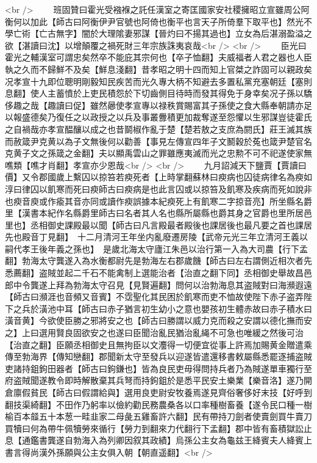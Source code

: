 <br />
　　班固贊曰霍光受襁褓之託任漢室之寄匡國家安社稷擁昭立宣雖周公阿衡何以加此【師古曰阿衡伊尹官號也阿倚也衡平也言天子所倚羣下取平也】然光不學亡術【亡古無字】闇於大理隂妻邪謀【晉灼曰不揚其過也】立女為后湛溺盈溢之欲【湛讀曰沈】以增顛覆之禍死財三年宗族誅夷哀哉<br />
<br />
　　臣光曰霍光之輔漢室可謂忠矣然卒不能庇其宗何也【卒子恤翻】夫威福者人君之器也人臣執之久而不歸鮮不及矣【鮮息淺翻】昔孝昭之明十四而知上官桀之詐固可以親政矣况孝宣十九即位聰明剛毅知民疾苦而光久專大柄不知避去多置私黨充塞朝廷【塞則息翻】使人主蓄憤於上吏民積怨於下切齒側目待時而發其得免于身幸矣况子孫以驕侈趣之哉【趣讀曰促】雖然曏使孝宣專以禄秩賞賜富其子孫使之食大縣奉朝請亦足以報盛德矣乃復任之以政授之以兵及事叢釁積更加裁奪遂至怨懼以生邪謀豈徒霍氏之自禍哉亦孝宣醖釀以成之也昔鬬椒作亂于楚【楚若敖之支庶為閼氏】莊王滅其族而赦箴尹克黄以為子文無後何以勸善【事見左傳宣四年子文鬭穀於菟也箴尹楚官名克黄子文之孫箴之金翻】夫以顯禹雲山之罪雖應夷滅而光之忠勲不可不祀遂使家無噍類【噍才肖翻】孝宣亦少恩哉<br />
<br />
　　九月詔減天下鹽賈【賈讀曰價】又令郡國歲上繫囚以掠笞若瘐死者【上時掌翻蘇林曰瘐病也囚徒病律名為瘐如淳曰律囚以飢寒而死曰瘐師古曰瘐病是也此言囚或以掠笞及飢寒及疾病而死如說非也瘐音庾或作瘉其音亦同或讀作瘐誤據本紀瘐死上有飢寒二字掠音亮】所坐縣名爵里【漢書本紀作名縣爵里師古曰名者其人名也縣所屬縣也爵其身之官爵也里所居邑里也】丞相御史課殿最以聞【師古曰凡言殿最者殿後也課居後也最凡要之首也課居先也殿音丁見翻】　十二月清河王年坐内亂廢遷房陵【武帝元光三年立清河王義以嗣代孝王後年義之孫也】　是歲北海太守廬江朱邑以治行第一入為大司農【行下孟翻】勃海太守龔遂入為水衡都尉先是勃海左右郡歲饑【師古曰左右謂側近相次者先悉薦翻】盗賊並起二千石不能禽制上選能治者【治直之翻下同】丞相御史舉故昌邑郎中令龔遂上拜為勃海太守召見【見賢遍翻】問何以治勃海息其盗賊對曰海瀕遐遠【師古曰瀕涯也音頻又音賓】不霑聖化其民困於飢寒而吏不恤故使陛下赤子盗弄陛下之兵於潢池中耳【師古曰赤子猶言初生幼小之意也嬰孩初生體赤故曰赤子積水曰潢音黄】今欲使臣勝之邪將安之也【師古曰勝謂以威力克而殺之安謂以德化撫而安之】上曰選用賢良固欲安之也遂曰臣聞治亂民猶治亂䋲不可急也唯緩之然後可治【治直之翻】臣願丞相御史且無拘臣以文灋得一切便宜從事上許焉加賜黄金贈遣乘傳至勃海界【傳知戀翻】郡聞新太守至發兵以迎遂皆遣還移書敕屬縣悉罷逐捕盗賊吏諸持鉏鉤田器者【師古曰鉤鎌也】皆為良民吏毋得問持兵者乃為賊遂單車獨行至府盗賊聞遂教令即時解散棄其兵弩而持鉤鉏於是悉平民安土樂業【樂音洛】遂乃開倉廪假貧民【師古曰假謂給與】選用良吏尉安牧養焉遂見齊俗奢侈好末技【好呼到翻技渠綺翻】不田作乃躬率以儉約勸民務農桑各以口率種樹畜養【遂令民口種一樹榆百本䪥五十本葱一畦韭家二母彘五雞畜許六翻】民有帶持刀劍者使賣劍買牛賣刀買犢曰何為帶牛佩犢勞來循行【勞力到翻來力代翻行下孟翻】郡中皆有畜積獄訟止息【通鑑書龔遂自勃海入為列卿因叙其政績】烏孫公主女為龜兹王絳賓夫人絳賓上書言得尚漢外孫願與公主女俱入朝【朝直遥翻】<br />
